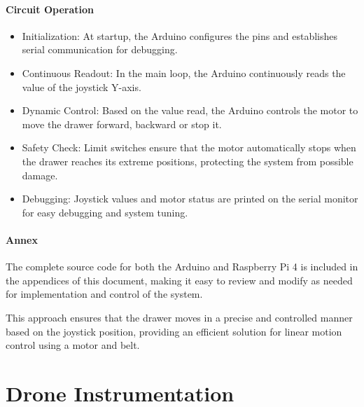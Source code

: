     
    \paragraph{\textbf{Circuit Operation}
    }
    \begin{itemize}
        \item Initialization: At startup, the Arduino configures the pins and establishes serial communication for debugging.
    \item Continuous Readout: In the main loop, the Arduino continuously reads the value of the joystick Y-axis.
    \item Dynamic Control: Based on the value read, the Arduino controls the motor to move the drawer forward, backward or stop it.
    \item Safety Check: Limit switches ensure that the motor automatically stops when the drawer reaches its extreme positions, protecting the system from possible damage.
    \item Debugging: Joystick values and motor status are printed on the serial monitor for easy debugging and system tuning.
    \end{itemize}
    
    \paragraph{\textbf{Annex}
    }
    The complete source code for both the Arduino and Raspberry Pi 4 is included in the appendices of this document, making it easy to review and modify as needed for implementation and control of the system.
    
    This approach ensures that the drawer moves in a precise and controlled manner based on the joystick position, providing an efficient solution for linear motion control using a motor and belt.

    







\section{Drone Instrumentation}

